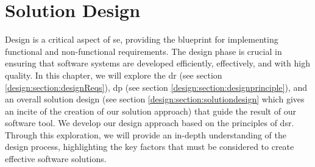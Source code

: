 
\chapter{Solution Design}

\ifpdf
    \graphicspath{{Chapters/Design/Figs/}{Chapters/Design/Figs/}{Chapters/Design/Figs/}}
\else
    \graphicspath{{Chapters/Design/Figs/}{Chapters/Design/Figs/}}
\fi
Design is a critical aspect of \ac{se}, providing the blueprint for implementing functional and non-functional requirements. 
The design phase is crucial in ensuring that software systems are developed efficiently, effectively, and with high quality. 
In this chapter, we will explore the \ac{dr} (see section \ref{design:section:designReqs}), \ac{dp} (see section \ref{design:section:designprinciple}), and an overall solution design (see section \ref{design:section:solutiondesign} which gives an incite of the creation of our solution approach) that guide the result of our software tool.
We develop our design approach based on the principles of \ac{dsr}. 
Through this exploration, we will provide an in-depth understanding of the design process, highlighting the key factors that must be considered to create effective software solutions.

